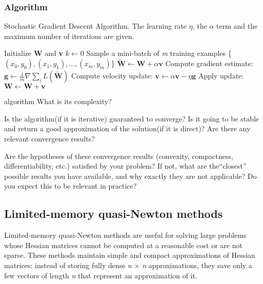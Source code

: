 \subsubsection{Algorithm}
\begin{algorithm}[H]
	\caption{Stochastic Gradient Descent Algorithm. The learning rate $\eta$, the $\alpha$ term and the maximum number of iterations are given.}
	\label{alg:sgd}
	\begin{algorithmic}[1]
		\State Initialize \textbf{W} and \textbf{v}
		\State $k \gets 0$
		\State Sample a mini-batch of \textit{m} training examples \{\textit{$(x_0,y_0),(x_1,y_1),...,(x_m,y_m)$}\}
		\State $\tilde{\textbf{W}} \gets \textbf{W} + \alpha \textbf{v}$
		\EndIf
		\State Compute gradient estimate: $\textbf{g} \gets \frac {1}{m} \nabla \sum_i\textit{L}(\tilde{\textbf{W}})$
		\State Compute velocity update: $\textbf{v} \gets \alpha \textbf{v} - \eta \textbf{g}$
		\State Apply update: $\textbf{W} \gets \textbf{W} + \textbf{v}$
		\EndWhile
		\EndProcedure
	\end{algorithmic}
\end{algorithm}



 algorithm What is its complexity?

Is the algorithm(if it is iterative) guaranteed to converge? Is it going to be stable and return a good approximation of the solution(if it is direct)?  Are there any relevant convergence results?

Are the hypotheses of these convergence results (convexity, compactness, differentiability, etc.) satisfied by your problem? If not, what are the“closest” possible results you have available, and why exactly they are not applicable?  Do you expect this to be relevant in practice?

\subsection{Limited-memory quasi-Newton methods}
Limited-memory quasi-Newton methods are useful for solving large problems whose Hessian matrices cannot be computed at a reasonable cost or are not sparse.  
These methods maintain simple and compact approximations of Hessian matrices: instead of storing fully dense \textit{n} $\times$ \textit{n} approximations, they save only a few vectors of length \textit{n} that represent an approximation of it. 
 
